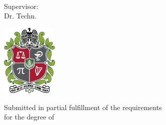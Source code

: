 \begin{titlepage}
	\begin{addmargin}[-1cm]{-3cm}
		\begin{center}
			\large
			
			\hfill
			
			\vfill
			
			\begingroup
			\color{CTtitle}\spacedallcaps{\myTitle} \\ \bigskip
			\endgroup
			
			\spacedlowsmallcaps{\mySubtitle} \\ \bigskip
			
			{\Large {}} \\
			
			\bigskip
			Supervisor:\\
			Dr. Techn. \mySupervisor
			
			\vfill
			
			\includegraphics[width=2.7cm]{gfx/escudo-unal} \\ \medskip
			
			
			\vfill
			
			Submitted in partial fulfillment of the requirements\\
			for the degree of\\ \medskip
			\myDegree \\ \medskip
			\myDepartment \\
			\myFaculty \\
			\myUni \\ \bigskip
			
			\myLocation \\
			
			\myTime\
			
			\vfill
			
		\end{center}
	\end{addmargin}
\end{titlepage}
